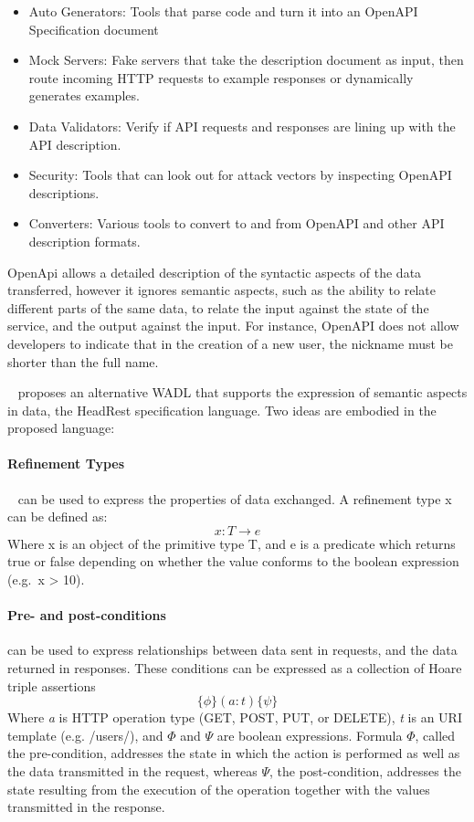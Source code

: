 \begin{itemize}
    \setlength\itemsep{0em}
    \item Auto Generators: Tools that parse code and turn it into an OpenAPI Specification document
    \item Mock Servers: Fake servers that take the description document as input, then route incoming HTTP requests to example responses or dynamically generates examples.
    \item Data Validators: Verify if API requests and responses are lining up with the API description.
    \item Security: Tools that can look out for attack vectors by inspecting OpenAPI descriptions.
    \item Converters: Various tools to convert to and from OpenAPI and other API description formats.
\end{itemize}

OpenApi allows a detailed description of the syntactic aspects of the data transferred, however it ignores semantic aspects, such as the ability to relate
different parts of the same data, to relate the input against the state of the service, and the output against the input.
For instance, OpenAPI does not allow developers to indicate that in the creation of a new user, the nickname must be shorter
than the full name.

\citeauthor{headRest}~\cite{headRest} proposes an alternative WADL that supports the expression of semantic aspects in data, the HeadRest specification language.
Two ideas are embodied in the proposed language:

\paragraph{Refinement Types}~\cite{freeman1991refinement} can be used to express the properties of data exchanged.
A refinement type x can be defined as:
\[ x:T \rightarrow e \]
Where x is an object of the primitive type T, and e is a predicate which returns true or false depending on whether the value conforms to the boolean expression (e.g.\ x > 10).

\paragraph{Pre- and post-conditions} can be used to express relationships between data sent in
requests, and the data returned in responses. These conditions can be expressed as a collection of Hoare triple assertions
\[ \{\phi\} (a : t) \{\psi\} \]
Where \emph{a} is HTTP operation type (GET, POST, PUT, or DELETE), \emph{t} is an URI template (e.g. /users/), and $\Phi$ and $\Psi$ are boolean expressions.
Formula $\Phi$, called the pre-condition, addresses the state in which the action is performed as well as the data transmitted in the request,
whereas $\Psi$, the post-condition, addresses the state resulting from the execution of the operation together with the values transmitted in the response.

